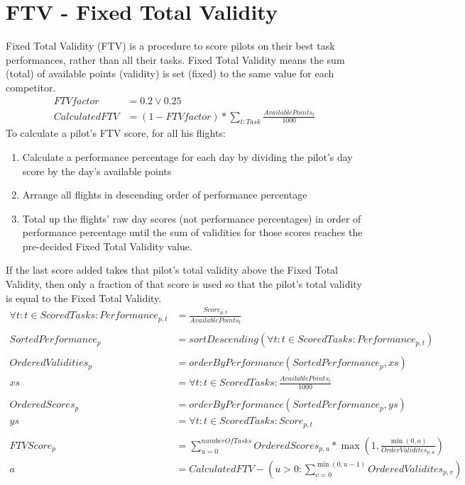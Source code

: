 \documentclass{article}
\begin{document}
\newpage
\section{FTV - Fixed Total Validity}
\label{sec:fixed-total-validity}
Fixed Total Validity (FTV) is a procedure to score pilots on their best task
performances, rather than all their tasks. Fixed Total Validity means the sum
(total) of available points (validity) is set (fixed) to the same value for
each competitor.
\begin{align*}
    FTVfactor &= 0.2 \lor 0.25 \\
    CalculatedFTV &= (1 - FTVfactor) * \sum_{t : Task}\frac{AvailablePoints_t}{1000}
\end{align*}
To calculate a pilot’s FTV score, for all his flights:
\begin{enumerate}
    \item
        Calculate a performance percentage for each day by dividing the pilot's
        day score by the day’s available points
    \item
        Arrange all flights in descending order of performance percentage
    \item
        Total up the flights' raw day scores (not performance percentages) in
        order of performance percentage until the sum of validities for those
        scores reaches the pre-decided Fixed Total Validity value.
\end{enumerate}
If the last score added takes that pilot's total validity above the Fixed Total Validity, then only a fraction
of that score is used so that the pilot's total validity is equal to the Fixed Total Validity.
\begin{align*}
    \forall t : t \in ScoredTasks : Performance_{p, t} &= \frac{Score_{p, t}}{AvailablePoints_t} \\
    \\
    SortedPerformance_p &= sortDescending(\forall t : t \in ScoredTasks : Performance_{p, t}) \\
    \\
    OrderedValidities_p &= orderByPerformance(SortedPerformance_p, xs) \\
    xs &= \forall t : t \in ScoredTasks : \frac{AvailablePoints_t}{1000} \\
    \\
    OrderedScores_p &= orderByPerformance(SortedPerformance_p, ys) \\
    ys &= \forall t : t \in ScoredTasks : Score_{p, t} \\
    \\
    FTVScore_p &= \sum_{u = 0}^{numberOfTasks} OrderedScores_{p, u} * \max(1, \frac{\min(0, a)}{OrderValidites_{p, u}}) \\
    a &= CalculatedFTV - (u > 0 : \sum_{v = 0}^{\min(0, u - 1)} OrderedValidites_{p, v})
\end{align*}
\end{document}
